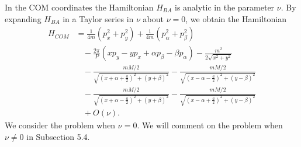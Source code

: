 \documentclass[12pt]{article}
\begin{document}
In the COM coordinates the Hamiltonian $H_{BA}$ is analytic in the parameter $\nu$. By expanding $H_{BA}$ in a Taylor series in $\nu$ about $\nu = 0$, we obtain the Hamiltonian
\begin{equation}
\begin{aligned}\label{eqn8}
H_{COM} & = \frac{1}{4m}\left(p_x^2 + p_y^2\right) + \frac{1}{4m}\left(p_\alpha^2 + p_\beta^2\right) \\
& \ \ \ \ - \frac{2\pi}{P}\left(xp_y - yp_x + \alpha p_\beta - \beta p_\alpha\right) - \frac{m^2}{2\sqrt{x^2 + y^2}} \\
& \ \ \ \ - \frac{mM/2}{\sqrt{(x + \alpha + \frac{a}{2})^2 + (y+\beta)^2}} - \frac{mM/2}{\sqrt{(x - \alpha - \frac{a}{2})^2 + (y-\beta)^2}} \\
& \ \ \ \ - \frac{mM/2}{\sqrt{(x + \alpha - \frac{a}{2})^2 + (y+\beta)^2}} - \frac{mM/2}{\sqrt{(x - \alpha + \frac{a}{2})^2 + (y-\beta)^2}} \\
& \ \ \ \ + O(\nu).
\end{aligned}
\end{equation}
We consider the problem when $\nu = 0$. We will comment on the problem when $\nu \neq 0$ in Subsection 5.4.
\end{document}
